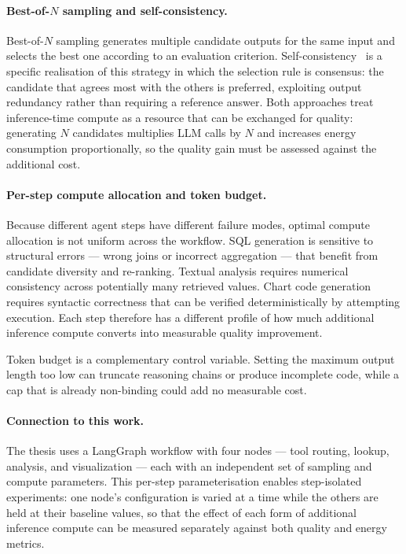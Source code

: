 \paragraph{Best-of-\texorpdfstring{$N$}{N} sampling and self-consistency.}
Best-of-$N$ sampling generates multiple candidate outputs for the same input
and selects the best one according to an evaluation criterion.
Self-consistency~\cite{wang2023selfconsistency} is a specific realisation of
this strategy in which the selection rule is consensus: the candidate that
agrees most with the others is preferred, exploiting output redundancy rather
than requiring a reference answer.
Both approaches treat inference-time compute as a resource that can be exchanged
for quality: generating $N$ candidates multiplies LLM calls by $N$ and
increases energy consumption proportionally, so the quality gain must be
assessed against the additional cost.

\paragraph{Per-step compute allocation and token budget.}
Because different agent steps have different failure modes, optimal compute
allocation is not uniform across the workflow.
SQL generation is sensitive to structural errors --- wrong joins or incorrect
aggregation --- that benefit from candidate diversity and re-ranking.
Textual analysis requires numerical consistency across potentially many
retrieved values.
Chart code generation requires syntactic correctness that can be verified
deterministically by attempting execution.
Each step therefore has a different profile of how much additional inference
compute converts into measurable quality improvement.

Token budget is a complementary control variable.
Setting the maximum output length too low can truncate reasoning chains or
produce incomplete code, while a cap that is already non-binding could add no
measurable cost.

\paragraph{Connection to this work.}
The thesis uses a LangGraph workflow with four nodes --- tool routing, lookup,
analysis, and visualization --- each with an independent set of sampling and
compute parameters.
This per-step parameterisation enables step-isolated experiments: one node's
configuration is varied at a time while the others are held at their baseline
values, so that the effect of each form of additional inference compute can be
measured separately against both quality and energy metrics.

